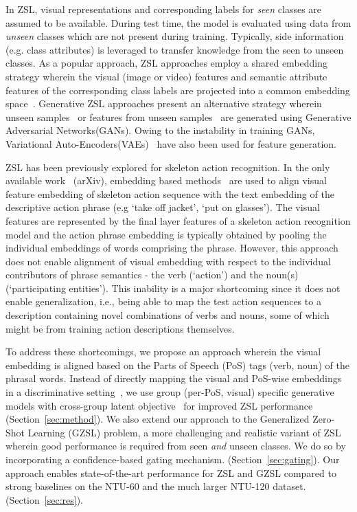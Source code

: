 \documentclass{article}
\begin{document}
In ZSL, visual representations and corresponding labels for \textit{seen} classes are assumed to be available. During test time, the model is evaluated using data from \textit{unseen} classes which are not present during training. Typically, side information (e.g. class attributes) is leveraged to transfer knowledge from the seen to unseen classes. As a popular approach, ZSL approaches employ a shared embedding strategy wherein the visual (image or video) features and semantic attribute features of the corresponding class labels are projected into a common embedding space~\cite{akata2015label, frome2013devise, akata2015evaluation, norouzi2013zero, xian2018feature,hubert2017learning, mukherjee2017deep}. Generative ZSL approaches present an alternative strategy wherein unseen samples~\cite{reed2016learning} or features from unseen samples~\cite{xian2018feature} are generated using Generative Adversarial Networks(GANs). Owing to the instability in training GANs, Variational Auto-Encoders(VAEs)~\cite{kumar2018generalized, mishra2018generative,schonfeld2019generalized} have also been used for feature generation. 
 
ZSL has been previously explored for skeleton action recognition. In the only available work~\cite{jasani2019skeleton} (arXiv), embedding based methods~\cite{frome2013devise, sung2018learning} are used to align visual feature embedding of skeleton action sequence with the text embedding of the descriptive action phrase (e.g `take off jacket', `put on glasses'). The visual features are represented by the final layer features of a  skeleton action recognition model and the action phrase embedding is typically obtained by pooling the individual embeddings of words comprising the phrase. However, this approach does not enable alignment of visual embedding with respect to the individual contributors of phrase semantics - the verb (`action') and the noun(s) (`participating entities'). This inability is a major shortcoming since it does not enable generalization, i.e., being able to map the test action sequences to a description containing novel combinations of verbs and nouns, some of which might be from training action descriptions themselves.  

To address these shortcomings, we propose an approach wherein the visual embedding is aligned based on the Parts of Speech (PoS) tags (verb, noun) of the phrasal words. Instead of directly mapping the visual and PoS-wise embeddings in a discriminative setting~\cite{wray2019fine}, we use group (per-PoS, visual) specific generative models with cross-group latent objective~\cite{schonfeld2019generalized} for improved ZSL performance (Section~\ref{sec:method}). We also extend our approach to the Generalized Zero-Shot Learning (GZSL) problem, a more challenging and realistic variant of ZSL wherein good performance is required from seen \textit{and} unseen classes. We do so by incorporating a confidence-based gating mechanism. (Section~\ref{sec:gating}). 
Our approach enables state-of-the-art performance for ZSL and GZSL compared to strong baselines on the NTU-60 and the much larger NTU-120 dataset. (Section~\ref{sec:res}).
\end{document}
